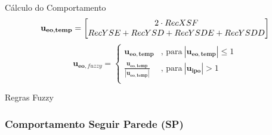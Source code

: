 \begin{frame}
	
\end{frame}

\begin{frame}
	
\end{frame}

\begin{frame}
	\begin{block}{Cálculo do Comportamento}
		\begin{equation}
				\mathbf{u_{eo,temp}} = 
				\mleft[
				\begin{matrix}
			  		2 \cdot RecXSF \\
			  		RecYSE + RecYSD + RecYSDE + RecYSDD \\
				\end{matrix}
				\mright]
		\end{equation}
		\pause
		\begin{equation}
				\mathbf{u_{eo,\mathit{fuzzy}}} = 
				\begin{cases}
					\mathbf{u_{eo,temp}} & \text{, para} \ | \mathbf{u_{eo,temp}} | \leq 1 \\
					\frac{\mathbf{u_{eo,temp}}}{| \mathbf{u_{eo,temp}} |} & \text{, para} \ | \mathbf{u_{ipo}} | > 1 \\
				\end{cases}
		\end{equation}
	\end{block}
\end{frame}

\begin{frame}
	\begin{exampleblock}{Regras Fuzzy}
		
	\end{exampleblock}
\end{frame}

\begin{frame}
	\frametitle{Comportamento Seguir Parede (SP)}
	
\end{frame}

\begin{frame}
	
\end{frame}

\begin{frame}
	
\end{frame}

